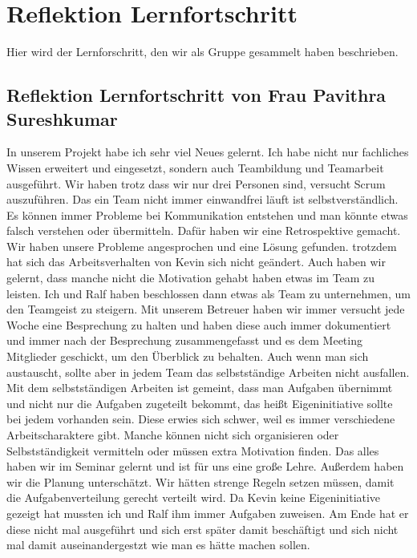 \section{Reflektion Lernfortschritt}
Hier wird der Lernforschritt, den wir als Gruppe gesammelt haben beschrieben.

\subsection{Reflektion Lernfortschritt von Frau Pavithra Sureshkumar}
In unserem Projekt habe ich sehr viel Neues gelernt. Ich habe nicht nur fachliches Wissen erweitert und eingesetzt, sondern auch Teambildung und Teamarbeit ausgeführt. Wir haben trotz dass wir nur drei Personen sind, versucht Scrum auszuführen.\newline
Das ein Team nicht immer einwandfrei läuft ist selbstverständlich. 
Es können immer Probleme bei Kommunikation entstehen und man könnte etwas falsch verstehen oder übermitteln. 
Dafür haben wir eine Retrospektive gemacht. Wir haben unsere Probleme angesprochen und eine Lösung gefunden. trotzdem hat sich das Arbeitsverhalten von Kevin sich nicht geändert.
Auch haben wir gelernt, dass manche nicht die Motivation gehabt haben etwas im Team zu leisten. Ich und Ralf haben beschlossen dann etwas als Team zu unternehmen, um den Teamgeist zu steigern. 
Mit unserem Betreuer haben wir immer versucht jede Woche eine Besprechung zu halten und haben diese auch immer dokumentiert und immer nach der Besprechung zusammengefasst und es dem Meeting Mitglieder geschickt, um den Überblick zu behalten. 
Auch wenn man sich austauscht, sollte aber in jedem Team das selbstständige Arbeiten nicht ausfallen. Mit dem selbstständigen Arbeiten ist gemeint, 
dass man Aufgaben übernimmt und nicht nur die Aufgaben zugeteilt bekommt, das heißt Eigeninitiative sollte bei jedem vorhanden sein. Diese erwies sich schwer, weil es immer verschiedene Arbeitscharaktere gibt. 
Manche können nicht sich organisieren oder Selbstständigkeit vermitteln oder müssen extra Motivation finden. Das alles haben wir im Seminar gelernt und ist für uns eine große Lehre.\newline
Außerdem haben wir die Planung unterschätzt. Wir hätten strenge Regeln setzen müssen, damit die Aufgabenverteilung gerecht verteilt wird. Da Kevin keine Eigeninitiative gezeigt hat mussten ich und Ralf
ihm immer Aufgaben zuweisen. Am Ende hat er diese nicht mal ausgeführt und sich erst später damit beschäftigt und sich nicht mal damit auseinandergestzt wie man es hätte machen sollen.
